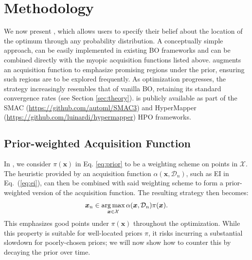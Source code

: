 \documentclass{article}
\newcommand{\method}[0]{\text{${\pi}$BO}\xspace}
\newcommand{\pri}[0]{{\pi}}
\begin{document}
\section{Methodology}\label{sec:methodology}
We now present \method{}, which allows users to specify their belief about the location of the optimum through any probability distribution. A conceptually simple approach, \method{} can be easily implemented in existing BO frameworks and can be combined directly with the myopic acquisition functions listed above. \method{} augments an acquisition function to emphasize promising regions under the prior, ensuring such regions are to be explored frequently. As optimization progresses, the \method{} strategy increasingly resembles that of vanilla BO, retaining its standard convergence rates (see Section \ref{sec:theory}).  \method{} is publicly available as part of the SMAC (\url{https://github.com/automl/SMAC3}) and HyperMapper (\url{https://github.com/luinardi/hypermapper}) HPO frameworks.
 \subsection{Prior-weighted Acquisition Function}\label{sec:pw_acq}
In \method{}, we consider $\pri(\bm{x})$ in Eq. \eqref{eq:prior} to be a weighting scheme on points in $\mathcal{X}$.
The heuristic provided by an acquisition function $\alpha(\bm{x}, \mathcal{D}_n)$, such as EI in Eq.~(\ref{eq:ei}), can then be combined with said weighting scheme to form a prior-weighted version of the acquisition function. The resulting strategy then becomes:
\begin{equation} \label{eq: pbo}
    \bm{x}_n \in \argmax_{\bm{x}\in\mathcal{X}} \alpha(\bm{x}, \mathcal{D}_n) \pri(\bm{x}). 
\end{equation}
This emphasizes good points under $\pri(\bm{x})$ throughout the optimization. While this property is suitable for well-located priors $\pri$, it risks incurring a substantial
slowdown for poorly-chosen priors; we will now show how to counter this by decaying the prior over time.
\end{document}
